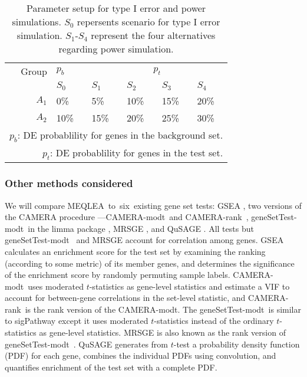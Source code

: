 \documentclass[useAMS,usenatbib, galley]{biom}
\newcommand{\OurMethod}{MEQLEA}
\newcommand{\HowmanyTest}{six}
\newcommand{\CMR}{CAMERA-rank}
\newcommand{\CMT}{CAMERA-modt}
\newcommand{\gent}{geneSetTest-modt}
\begin{document}
		
		\begin{table}[!ht]
			\centering
			\caption{Parameter setup for type I error and power simulations. $S_0$ repersents scenario for type I error simulation. $S_1$-$S_4$ represent the four alternatives regarding power simulation.}
			\begin{tabular}{rp{1cm}p{1cm}p{1cm}p{1cm}p{1cm}}
				\hline\hline
				Group & $p_b$ &  \multicolumn{4}{c}{$p_t$}  \\ 
				\cline{3-6}
				& $S_0$  & $S_1$ & $S_2$ & $S_3$ & $S_4$\\ 
				\hline
				$A_1$ & 0\%   & 5\% & 10\% & 15\% & 20\%\\ 
				$A_2$ & 10\%  & 15\%& 20\%& 25\% & 30\%\\ 
				\hline\hline
				\multicolumn{6}{p{8cm}}{$p_b$: DE probablility for genes in the background set. }	 \\	
				\multicolumn{6}{p{8cm}}{$p_t$: DE probablility for genes in the test set. }	 \\	
			\end{tabular}
			\label{table:simusetup}
		\end{table}
	
		\subsubsection{Other methods considered}
		
		We will compare \OurMethod~to~\HowmanyTest~existing gene set tests: GSEA \citep{subramanian2005gene}, two versions of the CAMERA procedure ---\CMT~and \CMR~\citep{wu2012camera}, \gent~in the limma package \citep{smyth2005limma}, MRSGE \citep{michaud2008integrative}, and QuSAGE \citep{yaari2013quantitative}. All tests but \gent~ and MRSGE account for correlation among genes. GSEA calculates an enrichment score for the test set by examining the ranking (according to some metric) of its member genes, and determines the significance of the enrichment score by randomly permuting sample labels. \CMT~uses moderated $t$-statistics \citep{Smyth2004moderated} as gene-level statistics and estimate a VIF to account for between-gene correlations in the set-level statistic, and \CMR~is the rank version of the \CMT. The \gent~is similar to sigPathway \citep{tian2005discovering} except it uses moderated $t$-statistics instead of the ordinary $t$-statistics as gene-level statistics. MRSGE is also known as the rank version of \gent~\citep{wu2012camera}. QuSAGE generates from $t$-test a probability density function (PDF) for each gene, combines the individual PDFs using convolution, and quantifies enrichment of the test set with a complete PDF. 
		
\end{document}
